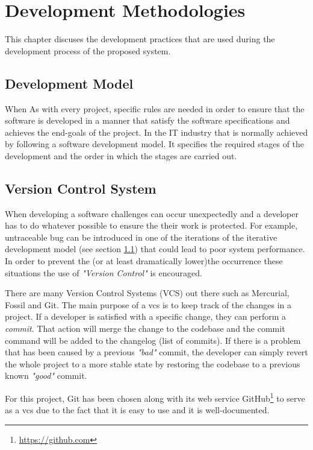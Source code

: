 \chapter{Development Methodologies}
This chapter discuses the development practices that are used during the development process of the proposed system.  

\section{Development Model}
\label{section:development-model}
When As with every project, specific rules are needed in order to ensure that the software is developed in a manner that satisfy the software specifications and achieves the end-goals of the project. In the IT industry that is normally achieved by following a software development model. It specifies the required stages of the development and the order in which the stages are carried out.

\section{Version Control System}
When developing a software challenges can occur unexpectedly and a developer has to do whatever possible to ensure the their work is protected. For example, untraceable bug can be introduced in one of the iterations of the iterative development model (see section \ref{section:development-model}) that could lead to poor system performance. In order to prevent the (or at least dramatically lower)the occurrence these situations the use of \textit{"Version Control"} is encouraged.

There are many Version Control Systems (VCS) out there such as Mercurial, Fossil and Git. The main purpose of a \gls{vcs} is to keep track of the changes in a project. If a developer is satisfied with a specific change, they can perform a \textit{commit}. That action will merge the change to the codebase and the commit command will be added to the changelog (list of commits). If there is a problem that has been caused by a previous \textit{"bad"} commit, the developer can simply revert the whole project to a more stable state by restoring the codebase to a previous known \textit{"good"} commit.

For this project, Git has been chosen along with its web service GitHub\footnote{\url{https://github.com}} to serve as a \gls{vcs} due to the fact that it is easy to use and it is well-documented.


